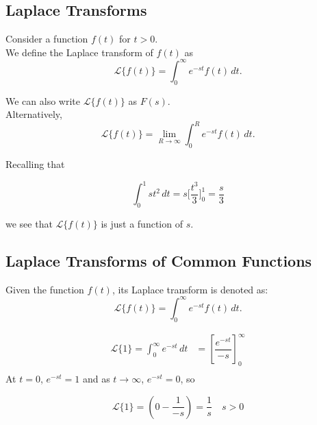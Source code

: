 \documentclass[a4paper]{extarticle}
\theoremstyle{definition}
\theoremstyle{plain}
\begin{document}
\subsection{Laplace Transforms}

\begin{definitionbox}
  Consider a function \(f(t)\) for \(t > 0\).\\[1ex]
  We define the Laplace transform of \(f(t)\) as
  \[
    \mathcal{L}\{f(t)\} = \int_0^\infty e^{-st} f(t) \, dt.
  \]
\end{definitionbox}

\begin{notebox}
  We can also write \( \mathcal{L}\{f(t)\} \) as \( F(s) \).\\[1ex]
  Alternatively,
  \[
    \mathcal{L}\{f(t)\} = \lim_{R \to \infty} \int_0^R e^{-st} f(t) \, dt.
  \]
\end{notebox}

\noindent Recalling that

$$\int_0^1 s t^2 \, dt = s\Big[\frac{t^3}{3}\Big]_0^1 = \frac{s}{3}$$

\noindent we see that \( \mathcal{L}\{f(t)\} \) is just a function of \( s \).

\pagebreak
\subsection{Laplace Transforms of Common Functions}
Given the function \( f(t) \), its Laplace transform is denoted as:
\[
  \mathcal{L}\{f(t)\} = \int_0^\infty e^{-st} f(t) \, dt.
\]
\begin{notebox}
  \begin{align*}
    \mathcal{L}\{1\} = \int_{0}^{\infty} e^{-st} \, dt
     & = \left[\dfrac{e^{-st}}{-s}\right]_0^\infty \\
  \end{align*}
  At \(t = 0\), \(e^{-st} = 1\) and as \(t \to \infty\), \(e^{-st} = 0\), so

  \[
    \mathcal{L}\{1\} = \left(0 - \frac{1}{-s}\right) = \frac{1}{s} \quad s > 0
  \]

\end{notebox}
\end{document}
